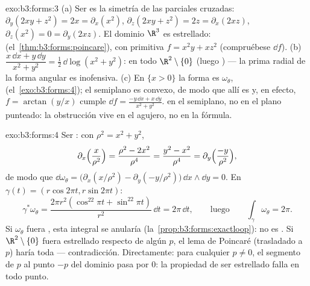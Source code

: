 \begin{solution}{exo:b3:forms:3}
(a) Ser  es la simetría de las parciales cruzadas:
$\partial_y(2xy + z^2) = 2x = \partial_x(x^2)$,
$\partial_z(2xy + z^2) = 2z = \partial_x(2xz)$,
$\partial_z(x^2) = 0 = \partial_y(2xz)$. El dominio $\R^3$ es
estrellado: 
(el~\cref{thm:b3:forms:poincare}), con primitiva $f = x^2y + xz^2$
(compruébese $\dd f$). (b) $\dfrac{x\,\dd x + y\,\dd y}{x^2 + y^2} =
\tfrac12\,\dd\log(x^2 + y^2)$: 
en todo $\R^2\setminus\{0\}$ (luego
) --- la prima radial de la
forma angular es inofensiva. (c) En $\{x > 0\}$ la forma es
$\omega_\theta$, 
(el~\cref{exo:b3:forms:4}); el semiplano es convexo, de modo que allí es
 y, en efecto,
$f = \arctan(y/x)$ cumple $\dd f
= \frac{-y\,\dd x + x\,\dd y}{x^2 + y^2}$.
 en el semiplano,
no  en el plano punteado: la
obstrucción vive en el agujero, no en la fórmula.
\end{solution}

\begin{solution}{exo:b3:forms:4}
Ser : con $\rho^2 = x^2 + y^2$,
\[
\partial_x\Bigl(\frac{x}{\rho^2}\Bigr) = \frac{\rho^2 -
2x^2}{\rho^4} = \frac{y^2 - x^2}{\rho^4} =
\partial_y\Bigl(\frac{-y}{\rho^2}\Bigr),
\]
de modo que $\dd\omega_\theta = \bigl(\partial_x(x/\rho^2) -
\partial_y(-y/\rho^2)\bigr)\,\dd x\wedge\dd y = 0$. En
$\gamma(t) = (r\cos2\pi t, r\sin2\pi t)$:
\[
\gamma^*\omega_\theta = \frac{2\pi r^2(\cos^22\pi t +
\sin^22\pi t)}{r^2}\,\dd t = 2\pi\,\dd t,
\qquad\text{luego}\qquad
\int_\gamma\omega_\theta = 2\pi .
\] Si $\omega_\theta$ fuera ,
esta integral se anularía (la~\cref{prop:b3:forms:exactloop}): no es
. Si $\R^2\setminus\{0\}$ fuera
estrellado respecto de algún $p$, el lema de Poincaré (trasladado a $p$)
haría  toda
 --- contradicción.
Directamente: para cualquier $p
\neq 0$, el segmento de $p$ al punto $-p$ del dominio pasa por $0$: la
propiedad de ser estrellado falla en todo punto.
\end{solution}

